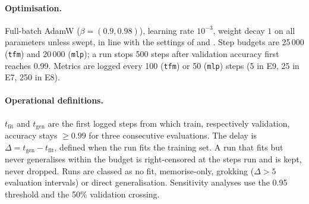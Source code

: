 \documentclass{article}
\begin{document}
\paragraph{Optimisation.} Full-batch AdamW \citep{loshchilov2017decoupled} ($\beta=(0.9,0.98)$), learning rate $10^{-3}$, weight decay $1$ on all parameters unless swept, in line with the settings of \citet{power2022grokking} and \citet{nanda2023progress}. Step budgets are 25\,000 (\texttt{tfm}) and 20\,000 (\texttt{mlp}); a run stops 500 steps after validation accuracy first reaches 0.99. Metrics are logged every 100 (\texttt{tfm}) or 50 (\texttt{mlp}) steps (5 in E9, 25 in E7, 250 in E8).

\paragraph{Operational definitions.} $t_{\mathrm{fit}}$ and $t_{\mathrm{gen}}$ are the first logged steps from which train, respectively validation, accuracy stays $\ge 0.99$ for three consecutive evaluations. The delay is $\Delta=t_{\mathrm{gen}}-t_{\mathrm{fit}}$, defined when the run fits the training set. A run that fits but never generalises within the budget is right-censored at the steps run and is kept, never dropped. Runs are classed as no fit, memorise-only, grokking ($\Delta>5$ evaluation intervals) or direct generalisation. Sensitivity analyses use the 0.95 threshold and the 50\% validation crossing.
\end{document}
